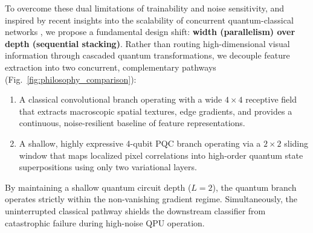 \documentclass[pdflatex,sn-mathphys-num]{sn-jnl}%
\theoremstyle{thmstyleone}%
\theoremstyle{thmstyletwo}%
\theoremstyle{thmstylethree}%
\begin{document}
To overcome these dual limitations of trainability and noise sensitivity, and inspired by recent insights into the scalability of concurrent quantum-classical networks \cite{kordzanganeh2023parallel}, we propose a fundamental design shift: \textbf{width (parallelism) over depth (sequential stacking)}. Rather than routing high-dimensional visual information through cascaded quantum transformations, we decouple feature extraction into two concurrent, complementary pathways (Fig.~\ref{fig:philosophy_comparison}):
\begin{enumerate}
    \item A classical convolutional branch operating with a wide $4 \times 4$ receptive field that extracts macroscopic spatial textures, edge gradients, and provides a continuous, noise-resilient baseline of feature representations.
    \item A shallow, highly expressive 4-qubit PQC branch operating via a $2 \times 2$ sliding window that maps localized pixel correlations into high-order quantum state superpositions using only two variational layers.
\end{enumerate}

By maintaining a shallow quantum circuit depth ($L=2$), the quantum branch operates strictly within the non-vanishing gradient regime. Simultaneously, the uninterrupted classical pathway shields the downstream classifier from catastrophic failure during high-noise QPU operation.
\end{document}
